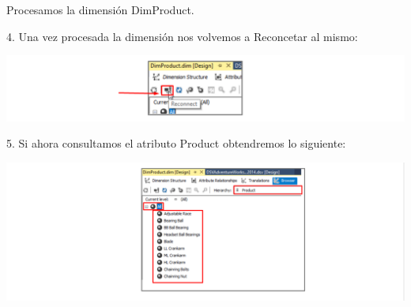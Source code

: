 Procesamos la dimensión DimProduct.

4. Una vez procesada la dimensión nos volvemos a Reconcetar al mismo:

	\begin{center}
	\includegraphics[width=\columnwidth]{images/task1/img4}
    \end{center}	

5. Si ahora consultamos el atributo Product obtendremos lo siguiente:

	\begin{center}
	\includegraphics[width=\columnwidth]{images/task1/img5}
    \end{center}	


    
